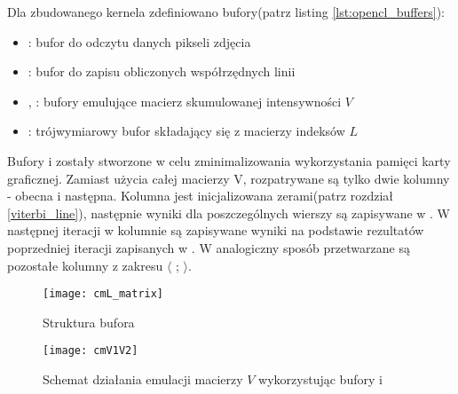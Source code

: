 \documentclass[document.tex]{subfiles}
\begin{document}
 

\indent Dla zbudowanego kernela zdefiniowano bufory(patrz listing \ref{lst:opencl_buffers}):
\begin{itemize}
\item {} : bufor do odczytu danych pikseli zdjęcia
\item {} : bufor do zapisu obliczonych współrzędnych linii
\item {},  : bufory emulujące macierz skumulowanej intensywności $V$
\item {} : trójwymiarowy bufor składający się z  macierzy indeksów $L$
\end{itemize}
Bufory  i  zostały stworzone w celu zminimalizowania wykorzystania pamięci karty graficznej.
Zamiast użycia całej macierzy V, rozpatrywane są tylko dwie kolumny - obecna i następna. Kolumna
 jest inicjalizowana zerami(patrz rozdział \ref{viterbi_line}), następnie wyniki dla poszczególnych 
wierszy są zapisywane w . W następnej iteracji w kolumnie  są zapisywane wyniki na podstawie rezultatów poprzedniej iteracji zapisanych w . W analogiczny sposób przetwarzane są pozostałe kolumny z zakresu $\langle$ ; $\rangle$.

 

\begin{figure}[h]
\texttt{[image: cmL\_matrix]}
\caption{Struktura bufora }
\label{fig:cmL}
\end{figure}

\begin{figure}[h]
\texttt{[image: cmV1V2]}
\caption{Schemat działania emulacji macierzy $V$ wykorzystując bufory  i }
\label{fig:cmV1V2}
\end{figure}
\end{document}
